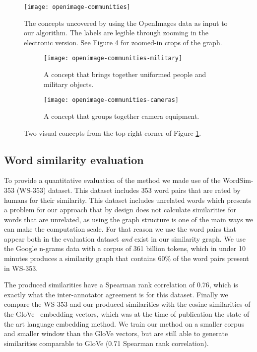 \begin{figure}
	\centering
	\texttt{[image: openimage-communities]}
	\caption{The concepts uncovered by using the OpenImages data as input to our algorithm.
	The labels are legible through zooming in the electronic version. See Figure \ref{fig:openimage-zoom} for zoomed-in crops of the graph.}
	\label{fig:openimages-concepts}
\end{figure}


\begin{figure}
	\centering
	\begin{subfigure}{\textwidth}
		\centering
		\texttt{[image: openimage-communities-military]}
		\caption{A concept that brings together uniformed people and military objects.}
		\label{fig:openimages-military}
	\end{subfigure}
	\begin{subfigure}{\textwidth}
		\centering
		\texttt{[image: openimage-communities-cameras]}
		\caption{A concept that groups together camera equipment.}
		\label{fig:openimages-cameras}
	\end{subfigure}
	\caption{Two visual concepts from the top-right corner of
		Figure \ref{fig:openimages-concepts}.}
	\label{fig:openimage-zoom}
\end{figure}

\subsection{Word similarity evaluation}

To provide a quantitative evaluation of the method we made use of the WordSim-353 (WS-353)
dataset. This dataset includes 353 word pairs that are rated by humans for their
similarity. This dataset includes unrelated words which presents a problem for
our approach that by design does not calculate similarities for words that are unrelated,
as using the graph structure is one of the main ways we can make the computation
scale. For that reason we use the word pairs that appear both in the evaluation
dataset \textit{and} exist in our similarity graph. We use the Google n-grams
data with a corpus of 361 billion tokens, which in under 10 minutes produces
a similarity graph that contains 60\% of the word pairs present in WS-353.

The produced similarities have a Spearman rank correlation of 0.76, which
is exactly what the inter-annotator agreement is for this dataset.
Finally we compare the WS-353 and our produced similarities with the
cosine similarities of the GloVe~\cite{glove} embedding vectors,
which was at the time of publication the state of the art language embedding
method. We train our method on a smaller corpus and smaller window than
the GloVe vectors, but are still able to generate similarities comparable
to GloVe (0.71 Spearman rank correlation).

